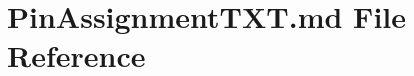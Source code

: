 \hypertarget{_pin_assignment_t_x_t_8md}{}\section{Pin\+Assignment\+T\+X\+T.\+md File Reference}
\label{_pin_assignment_t_x_t_8md}
